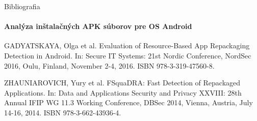 \documentclass{beamer}
\begin{document}
  \begin{frame}[label=bibliography]{Bibliografia}
    \framesubtitle{Analýza inštalačných APK súborov pre OS Android}
    \begin{thebibliography}{9}
      GADYATSKAYA, Olga et al. Evaluation of Resource-Based App Repackaging Detection in Android. In: Secure IT Systems: 21st Nordic Conference, NordSec 2016, Oulu, Finland, November 2-4, 2016. ISBN 978-3-319-47560-8.
          
                ZHAUNIAROVICH, Yury et al. FSquaDRA: Fast Detection
of Repackaged Applications. In: Data and Applications Security and Privacy XXVIII: 28th Annual IFIP WG 11.3 Working Conference, DBSec 2014, Vienna, Austria, July 14-16, 2014. ISBN 978-3-662-43936-4.
      
    \end{thebibliography}
  \end{frame}
\end{document}
